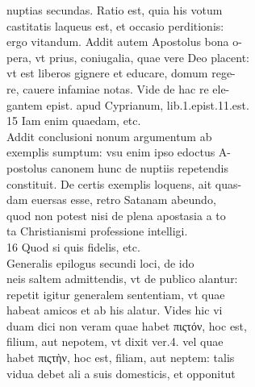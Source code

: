 \documentclass{article}
\begin{document}
\begin{pages}
                nuptias secundas. Ratio est, quia his votum \\
                castitatis laqueus est, et occasio perditionis: \\
                ergo vitandum. Addit autem Apostolus bona o- \\
                pera, vt prius, coniugalia, quae vere Deo placent: \\
                vt est liberos gignere et educare, domum rege- \\
                re, cauere infamiae notas. Vide de hac re ele- \\
                gantem epist. apud Cyprianum, lib.1.epist.11.est. \\
                15 Iam enim quaedam, etc. \\
                Addit conclusioni nonum argumentum ab \\
                exemplis sumptum: vsu enim ipso edoctus A- \\
                postolus canonem hunc de nuptiis repetendis \\
                constituit. De certis exemplis loquens, ait quas- \\
                dam euersas esse, retro Satanam abeundo, \\
                quod non potest nisi de plena apostasia a to \\
                ta Christianismi professione intelligi. \\
                16 Quod si quis fidelis, etc. \\
                Generalis epilogus secundi loci, de ido \\
                neis saltem admittendis, vt de publico alantur: \\
                repetit igitur generalem sententiam, vt quae \\
                habeat amicos et ab his alatur. Vides hic vi \\
                duam dici non veram quae habet πιςτόν, hoc est, \\
                filium, aut nepotem, vt dixit ver.4. vel quae \\
                habet πιςτὴν, hoc est, filiam, aut neptem: talis \\
                vidua debet ali a suis domesticis, et opponitut \\
\end{pages}
\end{document}
